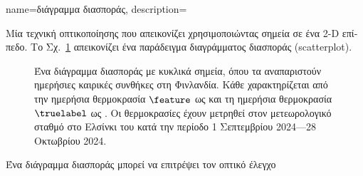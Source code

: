 {name={\foreignlanguage{greek}{διάγραμμα διασποράς}}, 
	description={\foreignlanguage{greek}{Μία} 
		\foreignlanguage{greek}{τεχνική οπτικοποίησης που απεικονίζει}  \foreignlanguage{greek}{χρησιμοποιώντας 
		σημεία σε ένα} 2-D \foreignlanguage{greek}{επίπεδο. Το Σχ.}\ \ref{fig_scatterplot_temp_FMI_dict} \foreignlanguage{greek}{απεικονίζει 
		ένα παράδειγμα διαγράμματος διασποράς} (scatterplot).   
		\begin{figure}[H]
			\begin{center}
				\vspace*{-10mm}
			\end{center}
		{
		\caption{\foreignlanguage{greek}{Ένα διάγραμμα διασποράς με κυκλικά σημεία, όπου τα}  
			\foreignlanguage{greek}{αναπαριστούν ημερήσιες καιρικές συνθήκες στη Φινλανδία. Κάθε} 
			 \foreignlanguage{greek}{χαρακτηρίζεται από την}  
			\foreignlanguage{greek}{ημερήσια θερμοκρασία $\feature$ ως}  \foreignlanguage{greek}{και τη} 
			 \foreignlanguage{greek}{ημερήσια θερμοκρασία $\truelabel$ ως} . 
			\foreignlanguage{greek}{Οι θερμοκρασίες έχουν μετρηθεί στον μετεωρολογικό σταθμό}  
			\foreignlanguage{greek}{στο Ελσίνκι του}  \foreignlanguage{greek}{κατά την περίοδο 
			1 Σεπτεμβρίου 2024—28 Οκτωβρίου 2024.} }
			\label{fig_scatterplot_temp_FMI_dict}}
		\vspace*{-3mm}
		\end{figure}
		\foreignlanguage{greek}{Ένα διάγραμμα διασποράς μπορεί να επιτρέψει τον οπτικό έλεγχο}  
}}
